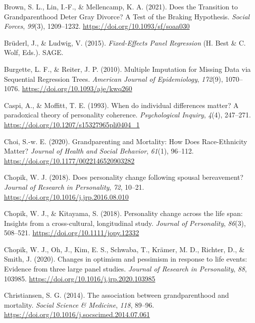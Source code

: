\documentclass[
  english,
  man, noextraspace]{apa7}
\begin{document}
\leavevmode\hypertarget{ref-brownDoesTransitionGrandparenthood2021}{}%
Brown, S. L., Lin, I.-F., \& Mellencamp, K. A. (2021). Does the Transition to Grandparenthood Deter Gray Divorce? A Test of the Braking Hypothesis. \emph{Social Forces}, \emph{99}(3), 1209--1232. \url{https://doi.org/10.1093/sf/soaa030}

\leavevmode\hypertarget{ref-bruderlFixedEffectsPanelRegression2015}{}%
Brüderl, J., \& Ludwig, V. (2015). \emph{Fixed-Effects Panel Regression} (H. Best \& C. Wolf, Eds.). SAGE.

\leavevmode\hypertarget{ref-burgetteMultipleImputationMissing2010}{}%
Burgette, L. F., \& Reiter, J. P. (2010). Multiple Imputation for Missing Data via Sequential Regression Trees. \emph{American Journal of Epidemiology}, \emph{172}(9), 1070--1076. \url{https://doi.org/10.1093/aje/kwq260}

\leavevmode\hypertarget{ref-caspiWhenIndividualDifferences1993}{}%
Caspi, A., \& Moffitt, T. E. (1993). When do individual differences matter? A paradoxical theory of personality coherence. \emph{Psychological Inquiry}, \emph{4}(4), 247--271. \url{https://doi.org/10.1207/s15327965pli0404_1}

\leavevmode\hypertarget{ref-choiGrandparentingMortalityHow2020}{}%
Choi, S.-w. E. (2020). Grandparenting and Mortality: How Does Race-Ethnicity Matter? \emph{Journal of Health and Social Behavior}, \emph{61}(1), 96--112. \url{https://doi.org/10.1177/0022146520903282}

\leavevmode\hypertarget{ref-chopikDoesPersonalityChange2018}{}%
Chopik, W. J. (2018). Does personality change following spousal bereavement? \emph{Journal of Research in Personality}, \emph{72}, 10--21. \url{https://doi.org/10.1016/j.jrp.2016.08.010}

\leavevmode\hypertarget{ref-chopikPersonalityChangeLife2018}{}%
Chopik, W. J., \& Kitayama, S. (2018). Personality change across the life span: Insights from a cross-cultural, longitudinal study. \emph{Journal of Personality}, \emph{86}(3), 508--521. \url{https://doi.org/10.1111/jopy.12332}

\leavevmode\hypertarget{ref-chopikChangesOptimismPessimism2020}{}%
Chopik, W. J., Oh, J., Kim, E. S., Schwaba, T., Krämer, M. D., Richter, D., \& Smith, J. (2020). Changes in optimism and pessimism in response to life events: Evidence from three large panel studies. \emph{Journal of Research in Personality}, \emph{88}, 103985. \url{https://doi.org/10.1016/j.jrp.2020.103985}

\leavevmode\hypertarget{ref-christiansenAssociationGrandparenthoodMortality2014}{}%
Christiansen, S. G. (2014). The association between grandparenthood and mortality. \emph{Social Science \& Medicine}, \emph{118}, 89--96. \url{https://doi.org/10.1016/j.socscimed.2014.07.061}
\end{document}
